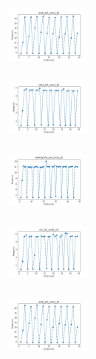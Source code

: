 \begin{figure}[H]
    \hfill
    \begin{subfigure}
        \centering
        \includegraphics[width=0.234\textwidth]{img/ils-es/ecoli_set_const_20_589741062_time.png}
    \end{subfigure}
    \hfill
    \begin{subfigure}
        \centering
        \includegraphics[width=0.234\textwidth]{img/ils-es/rand_set_const_20_589741062_time.png}
    \end{subfigure}
    \hfill
    \begin{subfigure}
        \centering
        \includegraphics[width=0.234\textwidth]{img/ils-es/newthyroid_set_const_20_589741062_time.png}
    \end{subfigure}
    \hfill
    \begin{subfigure}
        \centering
        \includegraphics[width=0.234\textwidth]{img/ils-es/iris_set_const_20_277451237_time.png}
    \end{subfigure}
    \hfill
    \begin{subfigure}
        \centering
        \includegraphics[width=0.234\textwidth]{img/ils-es/ecoli_set_const_20_277451237_time.png}
    \end{subfigure}
    \hfill
    \begin{subfigure}

\end{subfigure}
\end{figure}
